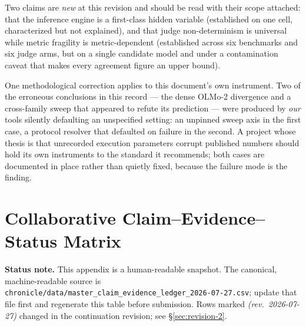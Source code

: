 \documentclass[11pt]{report}
\newcommand{\file}[1]{\texttt{#1}}
\begin{document}
\noindent Two claims are \emph{new} at this revision and should be read with their
scope attached: that the inference engine is a first-class hidden variable
(established on one cell, characterized but not explained), and that judge
non-determinism is universal while metric fragility is metric-dependent (established
across six benchmarks and six judge arms, but on a single candidate model and under
a contamination caveat that makes every agreement figure an upper bound).

\noindent One methodological correction applies to this document's own instrument.
Two of the erroneous conclusions in this record --- the dense OLMo-2 divergence and a
cross-family sweep that appeared to refute its prediction --- were produced by
\emph{our} tools silently defaulting an unspecified setting: an unpinned sweep axis
in the first case, a protocol resolver that defaulted on failure in the second. A
project whose thesis is that unrecorded execution parameters corrupt published
numbers should hold its own instruments to the standard it recommends; both cases
are documented in place rather than quietly fixed, because the failure mode is the
finding.



\chapter{Collaborative Claim--Evidence--Status Matrix}
\label{app:master-claim-matrix}

\noindent\textbf{Status note.} This appendix is a human-readable snapshot. The
canonical, machine-readable source is
\file{chronicle/data/master\_claim\_evidence\_ledger\_2026-07-27.csv}; update that
file first and regenerate this table before submission. Rows marked
\emph{(rev.\ 2026-07-27)} changed in the continuation revision; see
\S\ref{sec:revision-2}.

\end{document}
